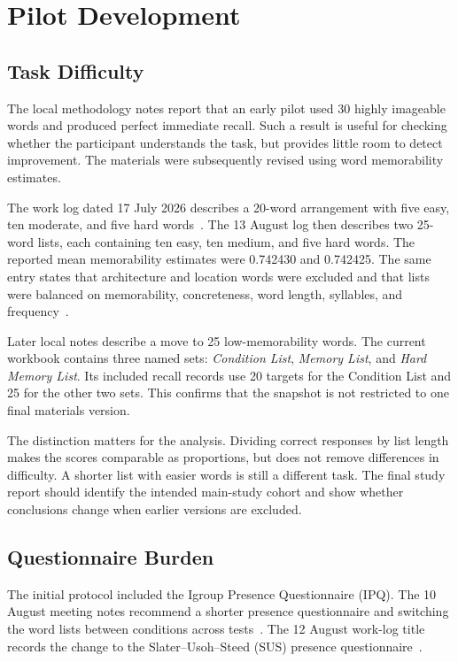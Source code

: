 
\section{Pilot Development}
\subsection{Task Difficulty}
The local methodology notes report that an early pilot used 30 highly imageable words and produced perfect immediate recall. Such a result is useful for checking whether the participant understands the task, but provides little room to detect improvement. The materials were subsequently revised using word memorability estimates.

The work log dated 17 July 2026 describes a 20-word arrangement with five easy, ten moderate, and five hard words~\cite{logjuly17}. The 13 August log then describes two 25-word lists, each containing ten easy, ten medium, and five hard words. The reported mean memorability estimates were 0.742430 and 0.742425. The same entry states that architecture and location words were excluded and that lists were balanced on memorability, concreteness, word length, syllables, and frequency~\cite{logaug13}.

Later local notes describe a move to 25 low-memorability words. The current workbook contains three named sets: \emph{Condition List}, \emph{Memory List}, and \emph{Hard Memory List}. Its included recall records use 20 targets for the Condition List and 25 for the other two sets. This confirms that the snapshot is not restricted to one final materials version.

The distinction matters for the analysis. Dividing correct responses by list length makes the scores comparable as proportions, but does not remove differences in difficulty. A shorter list with easier words is still a different task. The final study report should identify the intended main-study cohort and show whether conclusions change when earlier versions are excluded.

\subsection{Questionnaire Burden}
The initial protocol included the Igroup Presence Questionnaire (IPQ). The 10 August meeting notes recommend a shorter presence questionnaire and switching the word lists between conditions across tests~\cite{meetingaug10}. The 12 August work-log title records the change to the Slater--Usoh--Steed (SUS) presence questionnaire~\cite{logaug12}.

